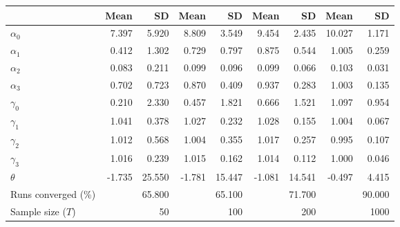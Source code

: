 
\begin{tabular}[t]{lrrrrrrrr}
\toprule
  & Mean & SD & Mean  & SD  & Mean   & SD   & Mean    & SD   \\
\midrule
$\alpha_{0}$ & 7.397 & 5.920 & 8.809 & 3.549 & 9.454 & 2.435 & 10.027 & 1.171\\
$\alpha_{1}$ & 0.412 & 1.302 & 0.729 & 0.797 & 0.875 & 0.544 & 1.005 & 0.259\\
$\alpha_{2}$ & 0.083 & 0.211 & 0.099 & 0.096 & 0.099 & 0.066 & 0.103 & 0.031\\
$\alpha_{3}$ & 0.702 & 0.723 & 0.870 & 0.409 & 0.937 & 0.283 & 1.003 & 0.135\\
$\gamma_{0}$ & 0.210 & 2.330 & 0.457 & 1.821 & 0.666 & 1.521 & 1.097 & 0.954\\
$\gamma_{1}$ & 1.041 & 0.378 & 1.027 & 0.232 & 1.028 & 0.155 & 1.004 & 0.067\\
$\gamma_{2}$ & 1.012 & 0.568 & 1.004 & 0.355 & 1.017 & 0.257 & 0.995 & 0.107\\
$\gamma_{3}$ & 1.016 & 0.239 & 1.015 & 0.162 & 1.014 & 0.112 & 1.000 & 0.046\\
$\theta$ & -1.735 & 25.550 & -1.781 & 15.447 & -1.081 & 14.541 & -0.497 & 4.415\\
Runs converged (\%) &  & 65.800 &  & 65.100 &  & 71.700 &  & 90.000\\
Sample size ($T$) &  & 50 &  & 100 &  & 200 &  & 1000\\
\bottomrule
\end{tabular}
